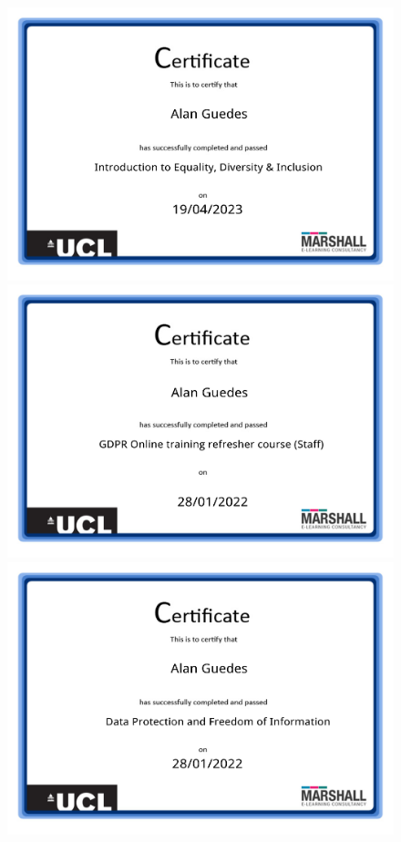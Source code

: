 \documentclass[10pt,a4paper,sans,colorlinks]{moderncv}
\begin{document}
\begin{figure}
    \centering \includegraphics[align=t,width=\textwidth,height=0.18\paperheight, keepaspectratio=true]{certificates/ucl-training/EDI.pdf}
    \centering \includegraphics[align=t,width=\textwidth,height=0.18\paperheight, keepaspectratio=true]{certificates/ucl-training/GDPR.pdf}
    \centering \includegraphics[align=t,width=\textwidth,height=0.18\paperheight, keepaspectratio=true]{certificates/ucl-training/Data_Protection_and_Freedom_information.pdf}

\end{figure}
\end{document}
